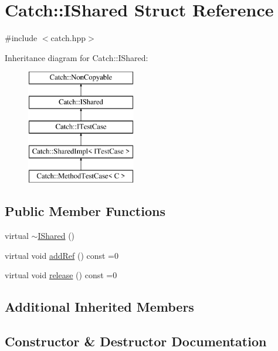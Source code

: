 \hypertarget{struct_catch_1_1_i_shared}{}\section{Catch\+:\+:I\+Shared Struct Reference}
\label{struct_catch_1_1_i_shared}


{\ttfamily \#include $<$catch.\+hpp$>$}

Inheritance diagram for Catch\+:\+:I\+Shared\+:\begin{figure}[H]
\begin{center}
\leavevmode
\includegraphics[height=5.000000cm]{struct_catch_1_1_i_shared}
\end{center}
\end{figure}
\subsection*{Public Member Functions}
\begin{DoxyCompactItemize}
\item 
virtual \mbox{\hyperlink{struct_catch_1_1_i_shared_a5e842e7540ae7ae0c62a2758123503f6}{$\sim$\+I\+Shared}} ()
\item 
virtual void \mbox{\hyperlink{struct_catch_1_1_i_shared_ae383df68557cdaf0910b411af04d9e33}{add\+Ref}} () const =0
\item 
virtual void \mbox{\hyperlink{struct_catch_1_1_i_shared_a002f52624728a763956fb6f230cb2f57}{release}} () const =0
\end{DoxyCompactItemize}
\subsection*{Additional Inherited Members}


\subsection{Constructor \& Destructor Documentation}
\mbox{\label{struct_catch_1_1_i_shared_a5e842e7540ae7ae0c62a2758123503f6}} 

